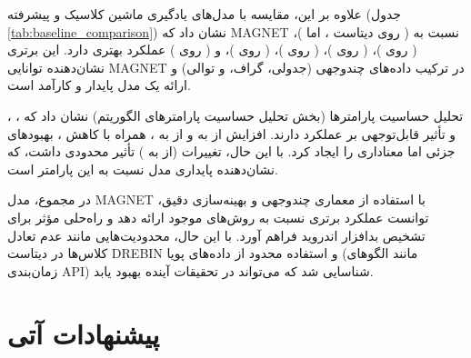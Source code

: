 علاوه بر این، مقایسه با مدل‌های یادگیری ماشین کلاسیک و پیشرفته (جدول \ref{tab:baseline_comparison}) نشان داد که MAGNET نسبت به  (  روی دیتاست ، اما  )،  (  روی )،  (  روی )،  (  روی )،  (  روی )، و  (  روی ) عملکرد بهتری دارد. این برتری نشان‌دهنده توانایی MAGNET در ترکیب داده‌های چندوجهی (جدولی، گراف، و توالی) و ارائه یک مدل پایدار و کارآمد است.

تحلیل حساسیت پارامترها (بخش تحلیل حساسیت پارامترهای الگوریتم) نشان داد که ، ، و  تأثیر قابل‌توجهی بر عملکرد دارند. افزایش  از  به  و  از  به ، همراه با کاهش ، بهبودهای جزئی اما معناداری را ایجاد کرد. با این حال، تغییرات  (از  به ) تأثیر محدودی داشت، که نشان‌دهنده پایداری مدل نسبت به این پارامتر است.

در مجموع، مدل MAGNET با استفاده از معماری چندوجهی و بهینه‌سازی دقیق، توانست عملکرد برتری نسبت به روش‌های موجود ارائه دهد و راه‌حلی مؤثر برای تشخیص بدافزار اندروید فراهم آورد. با این حال، محدودیت‌هایی مانند عدم تعادل کلاس‌ها در دیتاست DREBIN و استفاده محدود از داده‌های پویا (مانند الگوهای زمان‌بندی API) شناسایی شد که می‌تواند در تحقیقات آینده بهبود یابد.

\section{پیشنهادات آتی}
